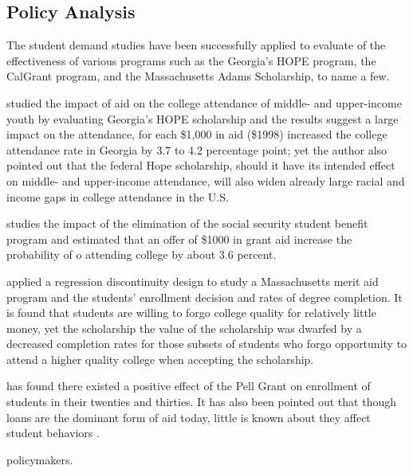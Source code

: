 \documentclass[12pt,english]{report}
\begin{document}
\subsection{Policy Analysis }
The student demand studies have been successfully applied to evaluate of the
effectiveness of various programs such as the Georgia's HOPE program, the
CalGrant program,  and the Massachusetts Adams Scholarship, to name a few.

\citet{Dynarski2000} studied the impact of aid on the college attendance of
middle- and upper-income youth by evaluating Georgia's HOPE scholarship and the
results suggest a large impact on the attendance, for each \$1,000 in aid
(\$1998) increased the college attendance rate in Georgia by 3.7  to 4.2
percentage point; yet the author also pointed out that the federal Hope
scholarship, should it have its intended effect on middle- and upper-income
attendance, will also widen already large racial and income gaps in college
attendance in the U.S.

\citet{Dynarski2003} studies the impact of the elimination of the social
security student benefit program and estimated that an offer of \$1000
in grant aid increase the probability of o attending college by about
3.6 percent.

\citet{Cohodes2014} applied a regression discontinuity design to study a
Massachusetts merit aid program and the students' enrollment decision
and rates of degree completion.  It is found that students are willing
to forgo college quality for relatively little money, yet the scholarship 
the value of the scholarship was dwarfed by a decreased completion rates 
for those subsets of students who  forgo opportunity to attend a higher 
quality college when accepting the scholarship.

\citet{Turner2002} has found there existed a positive effect of the Pell
Grant on enrollment of  students in their twenties and thirties.  
It has also been pointed  out that though loans are the dominant form
of aid today, little is known  about they affect  student
behaviors \citep{Dynarski2013}.   


policymakers.
\end{document}
